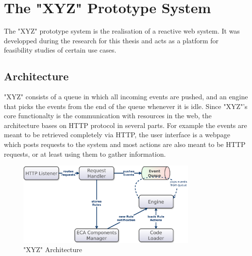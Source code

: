 
\chapter{The "XYZ" Prototype System}
%

% 


The "XYZ" prototype system is the realisation of a reactive web system.
It was developped during the research for this thesis and acts as a platform for feasibility studies of certain use cases.




\section{Architecture}
"XYZ" consists of a queue in which all incoming events are pushed, and an engine that picks the events from the end of the queue whenever it is idle.
Since "XYZ"'s core functionalty is the communication with resources in the web, the architecture bases on HTTP protocol in several parts.
For example the events are meant to be retrieved completely via HTTP, the user interface is a webpage which posts requests to the system and most actions are also meant to be HTTP requests, or at least using them to gather information.

\begin{figure}[!ht]
	\centering
  \includegraphics[width=0.8\textwidth]{figures/Architecture_woET}
	\caption{"XYZ" Architecture}
	\label{fig:Architecture_woEP}
\end{figure}

